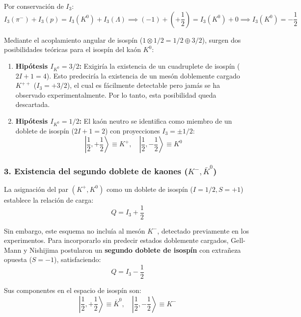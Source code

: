 Por conservación de $I_3$:
\begin{equation}
    I_3(\pi^-) + I_3(p) = I_3(K^0) + I_3(\Lambda) \implies (-1) + \left(+\frac{1}{2}\right) = I_3(K^0) + 0 \implies I_3(K^0) = -\frac{1}{2}
\end{equation}

Mediante el acoplamiento angular de isospín ($1 \otimes 1/2 = 1/2 \oplus 3/2$), surgen dos posibilidades teóricas para el isospín del kaón $K^0$:

\begin{enumerate}
    \item \textbf{Hipótesis $I_{K^0} = 3/2$:} Exigiría la existencia de un cuadruplete de isospín ($2I + 1 = 4$). Esto predeciría la existencia de un mesón doblemente cargado $K^{++}$ ($I_3 = +3/2$), el cual es fácilmente detectable pero jamás se ha observado experimentalmente. Por lo tanto, esta posibilidad queda descartada.
    
    \item \textbf{Hipótesis $I_{K^0} = 1/2$:} El kaón neutro se identifica como miembro de un doblete de isospín ($2I + 1 = 2$) con proyecciones $I_3 = \pm 1/2$:
    \begin{equation}
        \left| \frac{1}{2}, +\frac{1}{2} \right\rangle \equiv K^+, \quad \left| \frac{1}{2}, -\frac{1}{2} \right\rangle \equiv K^0
    \end{equation}
\end{enumerate}

\subsubsection*{3. Existencia del segundo doblete de kaones ($K^-, \bar{K}^0$)}

La asignación del par $(K^+, K^0)$ como un doblete de isospín ($I = 1/2, S = +1$) establece la relación de carga:
\begin{equation}
    Q = I_3 + \frac{1}{2}
\end{equation}

Sin embargo, este esquema no incluía al mesón $K^-$, detectado previamente en los experimentos. Para incorporarlo sin predecir estados doblemente cargados, Gell-Mann y Nishijima postularon un \textbf{segundo doblete de isospín} con extrañeza opuesta ($S = -1$), satisfaciendo:
\begin{equation}
    Q = I_3 - \frac{1}{2}
\end{equation}

Sus componentes en el espacio de isospín son:
\begin{equation}
    \left| \frac{1}{2}, +\frac{1}{2} \right\rangle \equiv \bar{K}^0, \quad \left| \frac{1}{2}, -\frac{1}{2} \right\rangle \equiv K^-
\end{equation}

